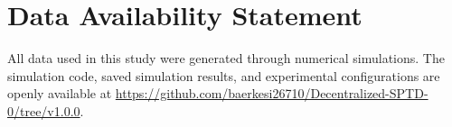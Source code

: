 \section*{Data Availability Statement}
All data used in this study were generated through numerical simulations.
The simulation code, saved simulation results, and experimental configurations
are openly available at \url{https://github.com/baerkesi26710/Decentralized-SPTD-0/tree/v1.0.0}.
